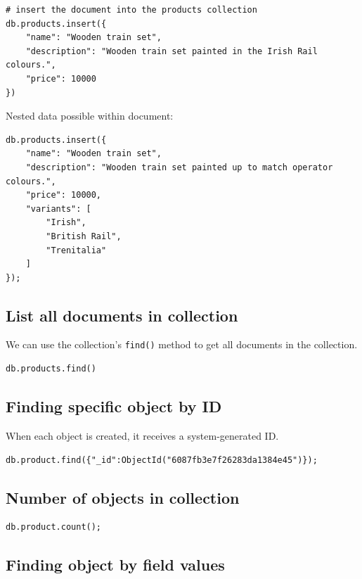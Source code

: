 \documentclass{pgnotes}
\begin{document}
\begin{verbatim}
# insert the document into the products collection
db.products.insert({
    "name": "Wooden train set",
    "description": "Wooden train set painted in the Irish Rail colours.",
    "price": 10000
})
\end{verbatim}

Nested data possible within document:

\begin{verbatim}
db.products.insert({
    "name": "Wooden train set",
    "description": "Wooden train set painted up to match operator colours.",
    "price": 10000,
    "variants": [
        "Irish",
        "British Rail",
        "Trenitalia"
    ]
});

\end{verbatim}

\subsection{List all documents in collection}

We can use the collection's \texttt{find()} method to get all documents in the collection.
\begin{verbatim}
db.products.find()
\end{verbatim}

\subsection{Finding specific object by ID}

When each object is created, it receives a system-generated ID.
\begin{verbatim}
db.product.find({"_id":ObjectId("6087fb3e7f26283da1384e45")});
\end{verbatim}

\subsection{Number of objects in collection}

\begin{verbatim}
db.product.count();
\end{verbatim}

\subsection{Finding object by field values}
\end{document}
